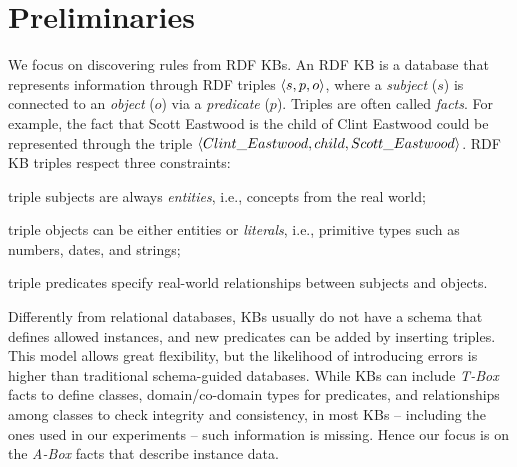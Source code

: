 \vspace{-1ex}
\section{Preliminaries}%
\label{sec:krd_prel}
\vspace{-0.2ex}
We focus on discovering rules from RDF KBs. An RDF KB is
a database that represents information through RDF triples $\langle s,p,o\rangle$, where a \emph{subject} ($s$) is connected to an \emph{object} ($o$) via a \emph{predicate} ($p$). Triples are often called \emph{facts}. For example, the fact that Scott Eastwood is the child of Clint Eastwood could be represented through the triple $\langle Clint\_Eastwood,child,Scott\_Eastwood\rangle$. 
RDF KB triples respect three constraints:
\begin{inparaenum}[(i)]
	\item triple subjects are always \emph{entities}, i.e., concepts from the real world;
	\item triple objects can be either entities or \emph{literals}, i.e.,  primitive types such as numbers, dates, and strings;
	\item triple predicates specify real-world relationships between subjects and objects.
\end{inparaenum}

Differently from relational databases, KBs usually do not have a schema that defines allowed instances,
and new predicates can be added by inserting triples. %
This model allows great flexibility, but the likelihood of introducing errors is higher than traditional schema-guided databases.
While KBs can include \emph{T-Box} facts to define classes, domain/co-domain types for predicates, and relationships among classes
to check integrity and consistency, in most KBs -- including the ones used in our experiments -- such information is missing. %
Hence our focus is on the \emph{A-Box} facts that describe instance data. 

\vspace{-1ex}
